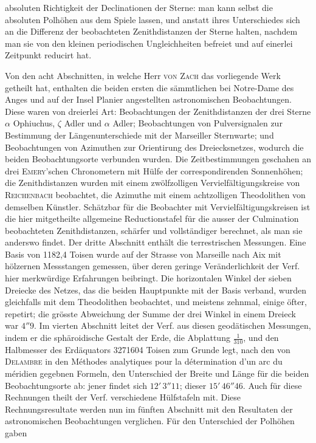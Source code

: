 absoluten Richtigkeit der Declinationen der Sterne: man kann selbst die absoluten Polhöhen aus dem Spiele lassen, und anstatt ihres Unterschiedes sich an die Differenz der beobachteten Zenithdistanzen der Sterne halten, nachdem man sie von den kleinen periodischen Ungleichheiten befreiet und auf einerlei Zeitpunkt reducirt hat.

Von den acht Abschnitten, in welche Herr \textsc{von Zach} das vorliegende Werk getheilt hat, enthalten die beiden ersten die sämmtlichen bei Notre-Dame des Anges und auf der Insel Planier angestellten astronomischen Beobachtungen. Diese waren von dreierlei Art: Beobachtungen der Zenithdistanzen der drei Sterne $\alpha$ Ophiuchus, $\zeta$ Adler und $\alpha$ Adler; Beobachtungen von Pulversignalen zur Bestimmung der Längenunterschiede mit der Marseiller Sternwarte; und Beobachtungen von Azimuthen zur Orientirung des Dreiecksnetzes, wodurch die beiden Beobachtungsorte verbunden wurden. Die Zeitbestimmungen geschahen an drei \textsc{Emery}'schen Chronometern mit Hülfe der correspondirenden Sonnenhöhen; die Zenithdistanzen wurden mit einem zwölfzolligen Vervielfältigungskreise von \textsc{Reichenbach} beobachtet, die Azimuthe mit einem achtzolligen Theodolithen von demselben Künstler. Schätzbar für die Beobachter mit Vervielfältigungskreisen ist die hier mitgetheilte allgemeine Reductionstafel für die ausser der Culmination beobachteten Zenithdistanzen, schärfer und vollständiger berechnet, als man sie anderswo findet. Der dritte Abschnitt enthält die terrestrischen Messungen. Eine Basis von 1182,4 Toisen wurde auf der Strasse von Marseille nach Aix mit hölzernen Messstangen gemessen, über deren geringe Veränderlichkeit der Verf. hier merkwürdige Erfahrungen beibringt. Die horizontalen Winkel der sieben Dreiecke des Netzes, das die beiden Hauptpunkte mit der Basis verband, wurden gleichfalls mit dem Theodolithen beobachtet, und meistens zehnmal, einige öfter, repetirt; die grösste Abweichung der Summe der drei Winkel in einem Dreieck war $4''9$. Im vierten Abschnitt leitet der Verf. aus diesen geodätischen Messungen, indem er die sphäroidische Gestalt der Erde, die Abplattung $\frac{1}{310}$, und den Halbmesser des Erdäquators 3271604 Toisen zum Grunde legt, nach den von \textsc{Delambre} in den Méthodes analytiques pour la détermination d'un arc du méridien gegebnen Formeln, den Unterschied der Breite und Länge für die beiden Beobachtungsorte ab: jener findet sich $12'\,3''11$; dieser $15'\,46''46$. Auch für diese Rechnungen theilt der Verf. verschiedene Hülfstafeln mit. Diese Rechnungsresultate werden nun im fünften Abschnitt mit den Resultaten der astronomischen Beobachtungen verglichen. Für den Unterschied der Polhöhen gaben

